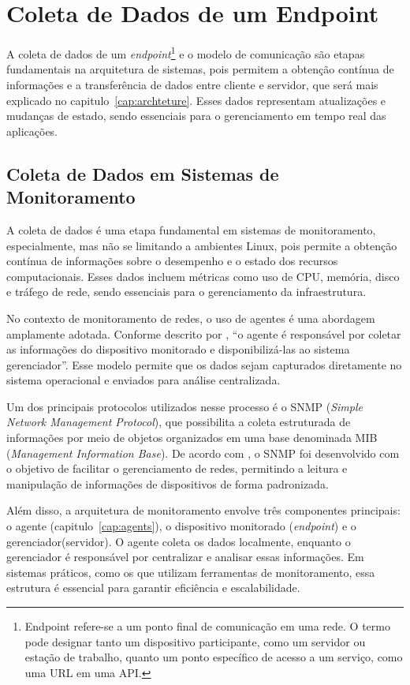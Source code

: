 \documentclass[
    12pt
    ,oneside
    ,a4paper
    ,chapter=TITLE
    ,section=TITLE
    ,sumario=abnt-6027-2012]{abntex2}
\begin{document}
\chapter{Coleta de Dados de um Endpoint}
\label{cap:data-collect}

A coleta de dados de um \textit{endpoint}\footnote{Endpoint refere-se a um ponto final de comunicação em uma rede. O termo pode designar tanto um dispositivo participante, como um servidor ou estação de trabalho, quanto um ponto específico de acesso a um serviço, como uma URL em uma API.} e o modelo de comunicação são etapas fundamentais na arquitetura de sistemas, pois permitem a obtenção contínua de informações e a transferência de dados entre cliente e servidor, que será mais explicado no capitulo~\ref{cap:archteture}. Esses dados representam atualizações e mudanças de estado, sendo essenciais para o gerenciamento em tempo real das aplicações.

\section{Coleta de Dados em Sistemas de Monitoramento}

A coleta de dados é uma etapa fundamental em sistemas de monitoramento, especialmente, mas não se limitando a ambientes Linux, pois permite a obtenção contínua de informações sobre o desempenho e o estado dos recursos computacionais. Esses dados incluem métricas como uso de CPU, memória, disco e tráfego de rede, sendo essenciais para o gerenciamento da infraestrutura.

No contexto de monitoramento de redes, o uso de agentes é uma abordagem amplamente adotada. Conforme descrito por , “o agente é responsável por coletar as informações do dispositivo monitorado e disponibilizá-las ao sistema gerenciador”. Esse modelo permite que os dados sejam capturados diretamente no sistema operacional e enviados para análise centralizada.

Um dos principais protocolos utilizados nesse processo é o SNMP (\textit{Simple Network Management Protocol}), que possibilita a coleta estruturada de informações por meio de objetos organizados em uma base denominada MIB (\textit{Management Information Base}). De acordo com , o SNMP foi desenvolvido com o objetivo de facilitar o gerenciamento de redes, permitindo a leitura e manipulação de informações de dispositivos de forma padronizada.

Além disso, a arquitetura de monitoramento envolve três componentes principais: o agente (capitulo~\ref{cap:agents}), o dispositivo monitorado (\textit{endpoint}) e o gerenciador(servidor). O agente coleta os dados localmente, enquanto o gerenciador é responsável por centralizar e analisar essas informações. Em sistemas práticos, como os que utilizam ferramentas de monitoramento, essa estrutura é essencial para garantir eficiência e escalabilidade.
\end{document}
